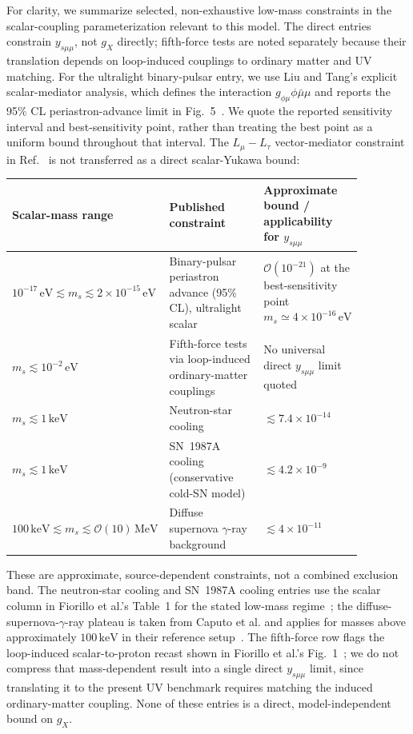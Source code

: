 \documentclass[12pt,a4paper]{article}
\begin{document}
For clarity, we summarize selected, non-exhaustive low-mass constraints in the scalar-coupling parameterization relevant to this model. The direct entries constrain \(y_{s\mu\mu}\), not \(g_X\) directly; fifth-force tests are noted separately because their translation depends on loop-induced couplings to ordinary matter and UV matching. For the ultralight binary-pulsar entry, we use Liu and Tang's explicit scalar-mediator analysis, which defines the interaction \(g_{\phi\mu}\phi\bar\mu\mu\) and reports the 95\% CL periastron-advance limit in Fig.~5~\cite{Liu:2025zuz}. We quote the reported sensitivity interval and best-sensitivity point, rather than treating the best point as a uniform bound throughout that interval. The \(L_\mu-L_\tau\) vector-mediator constraint in Ref.~\cite{Dror:2019uea} is not transferred as a direct scalar-Yukawa bound:
\begin{center}
\small
\begin{tabular}{p{0.28\linewidth}p{0.39\linewidth}p{0.20\linewidth}}
\hline
Scalar-mass range & Published constraint & Approximate bound / applicability for \(y_{s\mu\mu}\)\\
\hline
\(10^{-17}\,\mathrm{eV}\lesssim m_s\lesssim2\times10^{-15}\,\mathrm{eV}\) & Binary-pulsar periastron advance (95\% CL), ultralight scalar~\cite{Liu:2025zuz} & \(\mathcal{O}(10^{-21})\) at the best-sensitivity point \(m_s\simeq4\times10^{-16}\,\mathrm{eV}\)\\
\(m_s\lesssim10^{-2}\,\mathrm{eV}\) & Fifth-force tests via loop-induced ordinary-matter couplings~\cite{Fiorillo:2026wso,Hoskins:1985tn,Kapner:2006si,Blakemore:2021zna} & No universal direct \(y_{s\mu\mu}\) limit quoted\\
\(m_s\lesssim1\,\mathrm{keV}\) & Neutron-star cooling~\cite{Fiorillo:2026wso} & \(\lesssim7.4\times10^{-14}\)\\
\(m_s\lesssim1\,\mathrm{keV}\) & SN~1987A cooling (conservative cold-SN model)~\cite{Fiorillo:2026wso,Caputo:2021rux} & \(\lesssim4.2\times10^{-9}\)\\
\(100\,\mathrm{keV}\lesssim m_s\lesssim\mathcal{O}(10)\,\mathrm{MeV}\) & Diffuse supernova \(\gamma\)-ray background~\cite{Caputo:2021rux} & \(\lesssim4\times10^{-11}\)\\
\hline
\end{tabular}
\end{center}
These are approximate, source-dependent constraints, not a combined exclusion band. The neutron-star cooling and SN~1987A cooling entries use the scalar column in Fiorillo et al.'s Table~1 for the stated low-mass regime~\cite{Fiorillo:2026wso}; the diffuse-supernova-\(\gamma\)-ray plateau is taken from Caputo et al. and applies for masses above approximately \(100\,\mathrm{keV}\) in their reference setup~\cite{Caputo:2021rux}. The fifth-force row flags the loop-induced scalar-to-proton recast shown in Fiorillo et al.'s Fig.~1~\cite{Fiorillo:2026wso}; we do not compress that mass-dependent result into a single direct \(y_{s\mu\mu}\) limit, since translating it to the present UV benchmark requires matching the induced ordinary-matter coupling. None of these entries is a direct, model-independent bound on \(g_X\).
\end{document}
